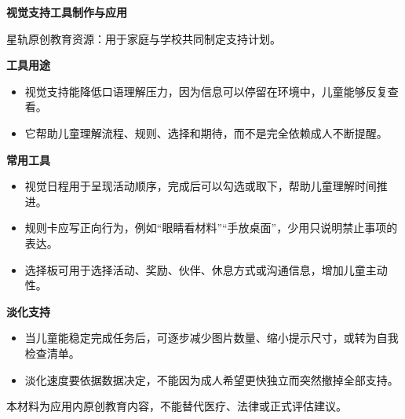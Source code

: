 \documentclass[11pt]{article}
\begin{document}
{\color[HTML]{1F5FD2}\LARGE\bfseries 视觉支持工具制作与应用\par}
{\color[HTML]{667085}\small 星轨原创教育资源：用于家庭与学校共同制定支持计划。\par}
\vspace{0.8em}
{\color[HTML]{111827}\large\bfseries 工具用途\par}
\begin{itemize}
\item 视觉支持能降低口语理解压力，因为信息可以停留在环境中，儿童能够反复查看。
\item 它帮助儿童理解流程、规则、选择和期待，而不是完全依赖成人不断提醒。
\end{itemize}
{\color[HTML]{111827}\large\bfseries 常用工具\par}
\begin{itemize}
\item 视觉日程用于呈现活动顺序，完成后可以勾选或取下，帮助儿童理解时间推进。
\item 规则卡应写正向行为，例如“眼睛看材料”“手放桌面”，少用只说明禁止事项的表达。
\item 选择板可用于选择活动、奖励、伙伴、休息方式或沟通信息，增加儿童主动性。
\end{itemize}
{\color[HTML]{111827}\large\bfseries 淡化支持\par}
\begin{itemize}
\item 当儿童能稳定完成任务后，可逐步减少图片数量、缩小提示尺寸，或转为自我检查清单。
\item 淡化速度要依据数据决定，不能因为成人希望更快独立而突然撤掉全部支持。
\end{itemize}
\vfill
{\color[HTML]{667085}\footnotesize 本材料为应用内原创教育内容，不能替代医疗、法律或正式评估建议。\par}
\end{document}
